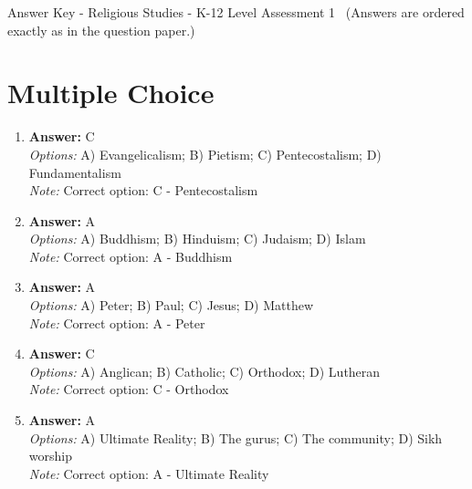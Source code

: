 \documentclass[12pt]{article}
\begin{document}
\begin{center}
Answer Key - Religious Studies - K-12 Level Assessment 1 \
\small (Answers are ordered exactly as in the question paper.)
\end{center}

\section*{Multiple Choice}
\begin{enumerate}[label=\arabic*.]
\item \textbf{Answer:} C
\\ \textit{Options:} A) Evangelicalism; B) Pietism; C) Pentecostalism; D) Fundamentalism
\\ \textit{Note:} Correct option: C - Pentecostalism
\item \textbf{Answer:} A
\\ \textit{Options:} A) Buddhism; B) Hinduism; C) Judaism; D) Islam
\\ \textit{Note:} Correct option: A - Buddhism
\item \textbf{Answer:} A
\\ \textit{Options:} A) Peter; B) Paul; C) Jesus; D) Matthew
\\ \textit{Note:} Correct option: A - Peter
\item \textbf{Answer:} C
\\ \textit{Options:} A) Anglican; B) Catholic; C) Orthodox; D) Lutheran
\\ \textit{Note:} Correct option: C - Orthodox
\item \textbf{Answer:} A
\\ \textit{Options:} A) Ultimate Reality; B) The gurus; C) The community; D) Sikh worship
\\ \textit{Note:} Correct option: A - Ultimate Reality
\end{enumerate}
\end{document}

